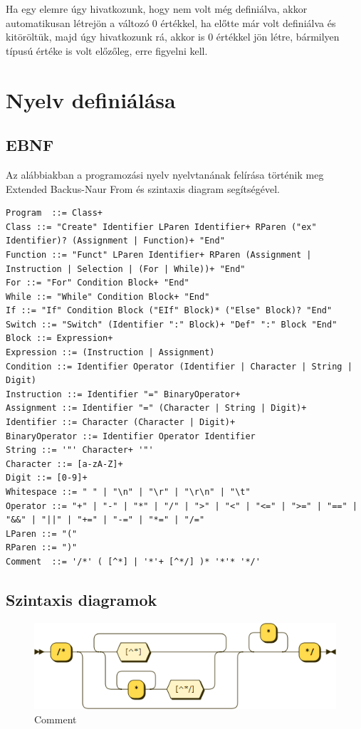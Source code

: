 Ha egy elemre úgy hivatkozunk, hogy nem volt még definiálva, akkor automatikusan létrejön a változó 0 értékkel, ha előtte már volt definiálva és kitöröltük, majd úgy hivatkozunk rá, akkor is 0 értékkel jön létre, bármilyen típusú értéke is volt előzőleg, erre figyelni kell.

\section{Nyelv definiálása}

\subsection{EBNF}

Az alábbiakban a programozási nyelv nyelvtanának felírása történik meg Extended Backus-Naur From és szintaxis diagram segítségével.

\begin{verbatim}
Program  ::= Class+
Class ::= "Create" Identifier LParen Identifier+ RParen ("ex" Identifier)? (Assignment | Function)+ "End"
Function ::= "Funct" LParen Identifier+ RParen (Assignment | Instruction | Selection | (For | While))+ "End"
For ::= "For" Condition Block+ "End"
While ::= "While" Condition Block+ "End"
If ::= "If" Condition Block ("EIf" Block)* ("Else" Block)? "End"
Switch ::= "Switch" (Identifier ":" Block)+ "Def" ":" Block "End"
Block ::= Expression+
Expression ::= (Instruction | Assignment)
Condition ::= Identifier Operator (Identifier | Character | String | Digit)
Instruction ::= Identifier "=" BinaryOperator+
Assignment ::= Identifier "=" (Character | String | Digit)+
Identifier ::= Character (Character | Digit)+
BinaryOperator ::= Identifier Operator Identifier
String ::= '"' Character+ '"'
Character ::= [a-zA-Z]+
Digit ::= [0-9]+
Whitespace ::= " " | "\n" | "\r" | "\r\n" | "\t"
Operator ::= "+" | "-" | "*" | "/" | ">" | "<" | "<=" | ">=" | "==" | "&&" | "||" | "+=" | "-=" | "*=" | "/="
LParen ::= "("
RParen ::= ")"
Comment  ::= '/*' ( [^*] | '*'+ [^*/] )* '*'* '*/'

\end{verbatim}

\subsection{Szintaxis diagramok}

\begin{figure}[h!]
\centering
\includegraphics[scale=0.5]{kepek/rr_comment.png}
\caption{Comment}
\label{fig:rr_comment}
\end{figure}

